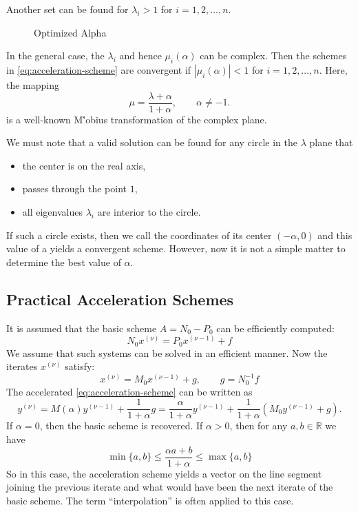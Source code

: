\documentclass[../main.tex]{subfiles}
\begin{document}
\begin{remark}
	Another set can be found for $\lambda_i > 1$ for $i = 1, 2, \ldots, n$.
\end{remark}

\begin{figure}[ht]
	\centering
	\caption{Optimized Alpha}
	\label{fig:optimized-alpha}
\end{figure}

In the general case, the $\lambda_i$ and hence $\mu_i(\alpha)$ can be complex. Then the schemes in \eqref{eq:acceleration-scheme} are convergent if $|\mu_i(\alpha)| < 1$ for $i = 1, 2, \ldots, n$. Here, the mapping
\begin{equation*}
	\mu = \frac{\lambda + \alpha}{1 + \alpha}, \qquad \alpha \neq -1.
\end{equation*}
is a well-known M\''obius transformation of the complex plane.

We must note that a valid solution can be found for any circle in the $\lambda$ plane that
\begin{itemize}
	\item the center is on the real axis,
	\item passes through the point $1$,
	\item all eigenvalues $\lambda_i$ are interior to the circle.
\end{itemize}
If such a circle exists, then we call the coordinates of its center $(-\alpha, 0)$ and this value of a yields a convergent scheme. However, now it is not a simple matter to determine the best value of $\alpha$.

\subsection{Practical Acceleration Schemes}
It is assumed that the basic scheme $A = N_0 - P_0$ can be efficiently computed:
\begin{equation*}
	N_0 x^{(\nu)} = P_0 x^{(\nu-1)} + f
\end{equation*}
We assume that such systems can be solved in an efficient manner. Now the iterates $x^{(\nu)}$ satisfy:
\begin{equation*}
	x^{(\nu)} = M_0 x^{(\nu-1)} + g, \qquad g = N_0^{-1} f
\end{equation*}
The accelerated \eqref{eq:acceleration-scheme} can be written as
\begin{equation} \label{eq:acceleration-iteration}
	y^{(\nu)} = M(\alpha) y^{(\nu-1)} + \frac{1}{1 + \alpha} g = \frac{\alpha}{1 + \alpha} y^{(\nu-1)} + \frac{1}{1 + \alpha} (M_0 y^{(\nu-1)} + g).
\end{equation}
If $\alpha = 0$, then the basic scheme is recovered. If $\alpha > 0$, then for any $a,b\in \mathbb{R}$ we have
\begin{equation*}
	\min \{a, b\} \leq \frac{\alpha a + b}{1 + \alpha} \leq \max \{a, b\}
\end{equation*}
So in this case, the acceleration scheme yields a vector on the line segment joining the previous iterate and what would have been the next iterate of the basic scheme. The term ``interpolation'' is often applied to this case.
\end{document}
